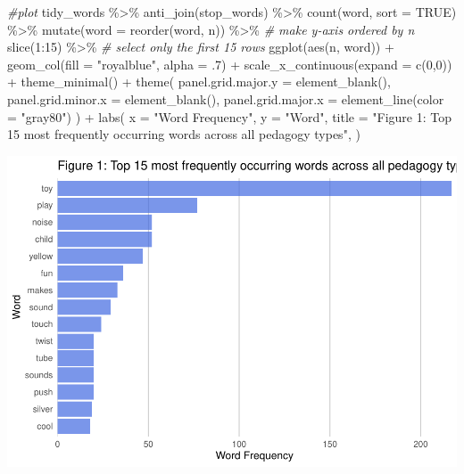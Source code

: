 \documentclass[
  english,
  man]{apa6}
\newenvironment{Shaded}{\begin{snugshade}}{\end{snugshade}}
\newcommand{\AttributeTok}[1]{\textcolor[rgb]{0.77,0.63,0.00}{#1}}
\newcommand{\CommentTok}[1]{\textcolor[rgb]{0.56,0.35,0.01}{\textit{#1}}}
\newcommand{\ConstantTok}[1]{\textcolor[rgb]{0.00,0.00,0.00}{#1}}
\newcommand{\DecValTok}[1]{\textcolor[rgb]{0.00,0.00,0.81}{#1}}
\newcommand{\FunctionTok}[1]{\textcolor[rgb]{0.00,0.00,0.00}{#1}}
\newcommand{\NormalTok}[1]{#1}
\newcommand{\SpecialCharTok}[1]{\textcolor[rgb]{0.00,0.00,0.00}{#1}}
\newcommand{\StringTok}[1]{\textcolor[rgb]{0.31,0.60,0.02}{#1}}
\begin{document}
\begin{Shaded}
\begin{Highlighting}[]
\CommentTok{\#plot}
\NormalTok{tidy\_words }\SpecialCharTok{\%\textgreater{}\%} 
  \FunctionTok{anti\_join}\NormalTok{(stop\_words) }\SpecialCharTok{\%\textgreater{}\%} 
  \FunctionTok{count}\NormalTok{(word, }\AttributeTok{sort =} \ConstantTok{TRUE}\NormalTok{) }\SpecialCharTok{\%\textgreater{}\%} 
  \FunctionTok{mutate}\NormalTok{(}\AttributeTok{word =} \FunctionTok{reorder}\NormalTok{(word, n)) }\SpecialCharTok{\%\textgreater{}\%} \CommentTok{\# make y{-}axis ordered by n}
  \FunctionTok{slice}\NormalTok{(}\DecValTok{1}\SpecialCharTok{:}\DecValTok{15}\NormalTok{) }\SpecialCharTok{\%\textgreater{}\%} \CommentTok{\# select only the first 15 rows}
  \FunctionTok{ggplot}\NormalTok{(}\FunctionTok{aes}\NormalTok{(n, word)) }\SpecialCharTok{+}
  \FunctionTok{geom\_col}\NormalTok{(}\AttributeTok{fill =} \StringTok{"royalblue"}\NormalTok{, }\AttributeTok{alpha =}\NormalTok{ .}\DecValTok{7}\NormalTok{) }\SpecialCharTok{+}
  \FunctionTok{scale\_x\_continuous}\NormalTok{(}\AttributeTok{expand =} \FunctionTok{c}\NormalTok{(}\DecValTok{0}\NormalTok{,}\DecValTok{0}\NormalTok{)) }\SpecialCharTok{+}
  \FunctionTok{theme\_minimal}\NormalTok{() }\SpecialCharTok{+}
  \FunctionTok{theme}\NormalTok{(}
    \AttributeTok{panel.grid.major.y =} \FunctionTok{element\_blank}\NormalTok{(),}
    \AttributeTok{panel.grid.minor.x =} \FunctionTok{element\_blank}\NormalTok{(),}
    \AttributeTok{panel.grid.major.x =} \FunctionTok{element\_line}\NormalTok{(}\AttributeTok{color =} \StringTok{"gray80"}\NormalTok{)}
\NormalTok{  ) }\SpecialCharTok{+}
  \FunctionTok{labs}\NormalTok{(}
    \AttributeTok{x =} \StringTok{"Word Frequency"}\NormalTok{,}
    \AttributeTok{y =} \StringTok{"Word"}\NormalTok{,}
    \AttributeTok{title =} \StringTok{"Figure 1: Top 15 most frequently occurring words across all pedagogy types"}\NormalTok{,}
\NormalTok{  )}
\end{Highlighting}
\end{Shaded}

\includegraphics{capstone640_files/figure-latex/initial plots-1.pdf}
\end{document}
